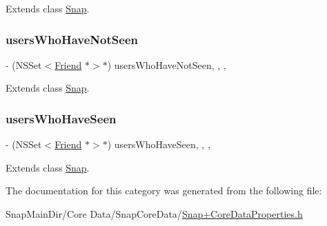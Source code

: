 Extends class \hyperlink{interface_snap_a0dd784f55f0e861a4270f6546470f8bd}{Snap}.

\hypertarget{category_snap_07_core_data_properties_08_a29505408f6f861f86ed6ab15807e3e70}{}\label{category_snap_07_core_data_properties_08_a29505408f6f861f86ed6ab15807e3e70} 
\subsubsection{\texorpdfstring{users\+Who\+Have\+Not\+Seen}{usersWhoHaveNotSeen}}
{\footnotesize\ttfamily -\/ (N\+S\+Set$<$\hyperlink{interface_friend}{Friend} $\ast$$>$$\ast$) users\+Who\+Have\+Not\+Seen\hspace{0.3cm}{\ttfamily [read]}, {\ttfamily [write]}, {\ttfamily [nonatomic]}, {\ttfamily [retain]}}



Extends class \hyperlink{interface_snap_a29505408f6f861f86ed6ab15807e3e70}{Snap}.

\hypertarget{category_snap_07_core_data_properties_08_ad7eed44d77fe25a4721f170f1a526133}{}\label{category_snap_07_core_data_properties_08_ad7eed44d77fe25a4721f170f1a526133} 
\subsubsection{\texorpdfstring{users\+Who\+Have\+Seen}{usersWhoHaveSeen}}
{\footnotesize\ttfamily -\/ (N\+S\+Set$<$\hyperlink{interface_friend}{Friend} $\ast$$>$$\ast$) users\+Who\+Have\+Seen\hspace{0.3cm}{\ttfamily [read]}, {\ttfamily [write]}, {\ttfamily [nonatomic]}, {\ttfamily [retain]}}



Extends class \hyperlink{interface_snap_ad7eed44d77fe25a4721f170f1a526133}{Snap}.



The documentation for this category was generated from the following file\+:\begin{DoxyCompactItemize}
\item 
Snap\+Main\+Dir/\+Core Data/\+Snap\+Core\+Data/\hyperlink{_snap_09_core_data_properties_8h}{Snap+\+Core\+Data\+Properties.\+h}\end{DoxyCompactItemize}

